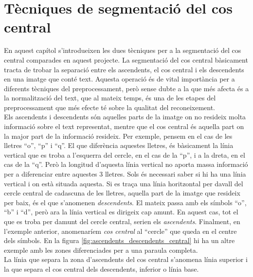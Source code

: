 \chapter{Tècniques de segmentació del cos central}
\label{cap:seg}
En aquest capítol s'introdueixen les dues tècniques per a la segmentació del cos central comparades en aquest projecte. La segmentació del cos central bàsicament tracta de trobar la separació entre els ascendents, el cos central i els descendents en una imatge que conté text. Aquesta operació és de vital importància per a diferents tècniques del preprocessament, però sense dubte a la que més afecta és a la normalització del text, que al mateix temps, és una de les etapes del preprocessament que més efecte té sobre la qualitat del reconeixement. \\

Els ascendents i descendents són aquelles parts de la imatge on no resideix molta informació sobre el text representat, mentre que el cos central és aquella part on la major part de la informació resideix. Per exemple, pensem en el cas de les lletres ``o'', ``p'' i ``q''. El que diferència aquestes lletres, és bàsicament la línia vertical que es troba a l'esquerra del cercle, en el cas de la ``p'', i a la dreta, en el cas de la ``q''. Però la longitud d'aquesta línia vertical no aporta massa informació per a diferenciar entre aquestes 3 lletres. Sols és necessari saber si hi ha una línia vertical i on està situada aquesta. Si es traça una línia horitzontal per davall del cercle central de cadascuna de les lletres, aquella part de la imatge que resideix per baix, és el que s'anomenen \emph{descendents}. El mateix passa amb els símbols ``o'', ``b'' i ``d'', però ara la línia vertical es dirigeix cap amunt. En aquest cas, tot el que es troba per damunt del cercle central, serien els \emph{ascendents}. Finalment, en l'exemple anterior, anomenaríem \emph{cos central} al ``cercle'' que queda en el centre dels símbols. En la figura \ref{fig:ascendents_descendents_central} hi ha un altre exemple amb les zones diferenciades per a una paraula completa. \\

La línia que separa la zona d'ascendents del cos central s'anomena línia superior i la que separa el cos central dels descendents, inferior o línia base. \\

